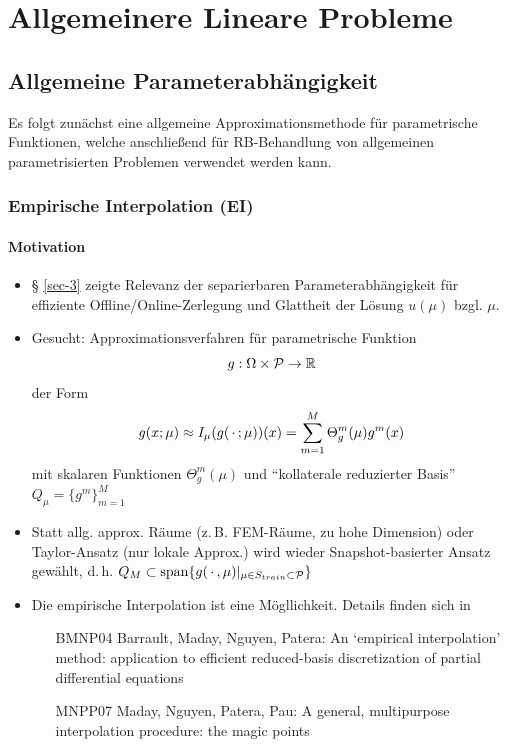 \section{Allgemeinere Lineare Probleme}
\label{sec-4}

\subsection{Allgemeine Parameterabhängigkeit}
\label{sec-4.1}

Es folgt zunächst eine allgemeine Approximationsmethode für parametrische Funktionen, welche anschließend für RB-Behandlung von allgemeinen parametrisierten Problemen verwendet werden kann.

\subsubsection*{Empirische Interpolation (EI)}

\paragraph*{Motivation}

\begin{itemize}
	\item § \ref{sec-3} zeigte Relevanz der separierbaren Parameterabhängigkeit für effiziente Offline/Online-Zerlegung und Glattheit der Lösung $u(\mu)$ bzgl. $\mu$.
	\item Gesucht: Approximationsverfahren für parametrische Funktion
	\[
		g: \Omega \times \mathcal{P} \rightarrow \mathbb{R}
	\]
	der Form
	\[
		g(x;\mu) \approx I_{\mu} (g(\,\cdot\,;\mu))(x) = \sum\limits_{m=1}^M \Theta_g^m(\mu) g^m(x)
	\]
	mit skalaren Funktionen $\Theta_g^m(\mu)$ und ``kollaterale reduzierter Basis'' $Q_{\mu} = \{g^m\}_{m=1}^M$
	\item Statt allg. approx. Räume (z.\,B. FEM-Räume, zu hohe Dimension) oder Taylor-Ansatz (nur lokale Approx.) wird wieder Snapshot-basierter Ansatz gewählt, d.\,h. $Q_M \subset \operatorname{span} \{g(\,\cdot\,,\mu)|_{\mu \in S_{train} \subset \mathcal{P}} \}$
	\item Die empirische Interpolation ist eine Mögllichkeit. Details finden sich in
	\begin{itemize}
		\item [BMNP04] Barrault, Maday, Nguyen, Patera: An ‘empirical interpolation’ method: application to efficient reduced-basis discretization of partial differential equations
		\item [MNPP07] Maday, Nguyen, Patera, Pau: A general, multipurpose interpolation procedure: the magic points
	\end{itemize}
\end{itemize}

